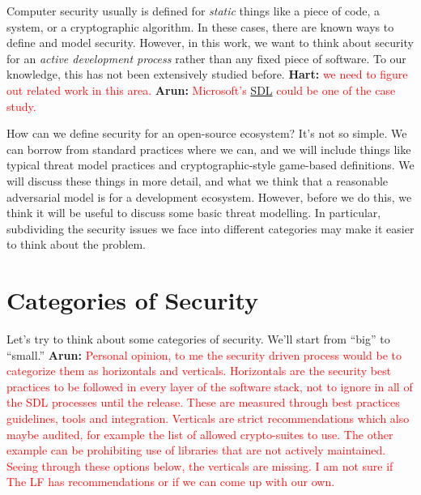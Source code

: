 
Computer security usually is defined for \emph{static} things like a piece of code, a system, or a cryptographic algorithm.  In these cases, there are known ways to define and model security.  However, in this work, we want to think about security for an \emph{active development process} rather than any fixed piece of software.  To our knowledge, this has not been extensively studied before.  \textbf{Hart:} \textcolor{red}{we need to figure out related work in this area.}  \textbf{Arun:} \textcolor{red}{Microsoft's \href{https://www.microsoft.com/en-us/securityengineering/sdl}{SDL} could be one of the case study.}

How can we define security for an open-source ecosystem?  It's not so simple.  We can borrow from standard practices where we can, and we will include things like typical threat model practices and cryptographic-style game-based definitions.  We will discuss these things in more detail, and what we think that a reasonable adversarial model is for a development ecosystem.  However, before we do this, we think it will be useful to discuss some basic threat modelling.  In particular, subdividing the security issues we face into different categories may make it easier to think about the problem.

\section{Categories of Security}
Let's try to think about some categories of security.  We'll start from ``big'' to ``small.'' \textbf{Arun:} \textcolor{red}{Personal opinion, to me the security driven process would be to categorize them as horizontals and verticals. Horizontals are the security best practices to be followed in every layer of the software stack, not to ignore in all of the SDL processes until the release. These are measured through best practices guidelines, tools and integration. Verticals are strict recommendations which also maybe audited, for example the list of allowed crypto-suites to use. The other example can be prohibiting use of libraries that are not actively maintained. Seeing through these options below, the verticals are missing. I am not sure if The LF has recommendations or if we can come up with our own.}


